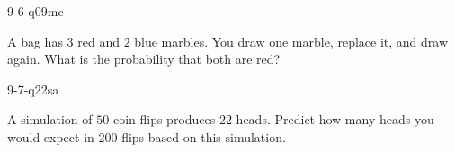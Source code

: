 \begin{practiceQuestion}{9-6-q09}{mc}
\begin{questionText}
A bag has $3$ red and $2$ blue marbles. You draw one marble, replace it, and draw again. What is the probability that both are red?
\end{questionText}
\end{practiceQuestion}

\begin{practiceQuestion}{9-7-q22}{sa}
\begin{questionText}
A simulation of $50$ coin flips produces $22$ heads. Predict how many heads you would expect in $200$ flips based on this simulation.
\end{questionText}
\end{practiceQuestion}

